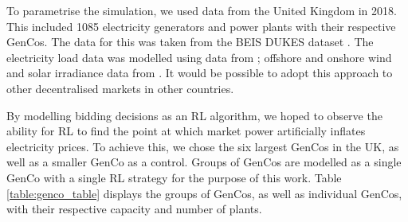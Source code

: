To parametrise the simulation, we used data from the United Kingdom in 2018. This included 1085 electricity generators and power plants with their respective GenCos. The data for this was taken from the BEIS DUKES dataset \cite{dukes_511}. The electricity load data was modelled using data from \cite{gbnationalgridstatus2019}; offshore and onshore wind and solar irradiance data from \cite{Pfenninger2016}. It would be possible to adopt this approach to other decentralised markets in other countries.

By modelling bidding decisions as an RL algorithm, we hoped to observe the ability for RL to find the point at which market power artificially inflates electricity prices. To achieve this, we chose the six largest GenCos in the UK, as well as a smaller GenCo as a control. Groups of GenCos are modelled as a single GenCo with a single RL strategy for the purpose of this work. Table \ref{table:genco_table} displays the groups of GenCos, as well as individual GenCos, with their respective capacity and number of plants.





